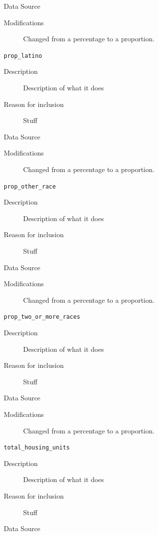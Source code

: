 \documentclass{article}
\begin{document}
\begin{itemize}[label={}, align=left]
\begin{description}
              \item[Data Source] \cite{acs_demographics_data}
              \item[Modifications] Changed from a percentage to a proportion.
          \end{description}
    \item[\texttt{prop\_latino}] \
          \begin{description}
              \item[Description] Description of what it does
              \item[Reason for inclusion] Stuff
              \item[Data Source] \cite{acs_demographics_data}
              \item[Modifications] Changed from a percentage to a proportion.
          \end{description}
    \item[\texttt{prop\_other\_race}] \
          \begin{description}
              \item[Description] Description of what it does
              \item[Reason for inclusion] Stuff
              \item[Data Source] \cite{acs_demographics_data}
              \item[Modifications] Changed from a percentage to a proportion.
          \end{description}
    \item[\texttt{prop\_two\_or\_more\_races}] \
          \begin{description}
              \item[Description] Description of what it does
              \item[Reason for inclusion] Stuff
              \item[Data Source] \cite{acs_demographics_data}
              \item[Modifications] Changed from a percentage to a proportion.
          \end{description}
    \item[\texttt{total\_housing\_units}] \
          \begin{description}
              \item[Description] Description of what it does
              \item[Reason for inclusion] Stuff
              \item[Data Source] \cite{acs_demographics_data}

\end{description}
\end{itemize}
\end{document}
